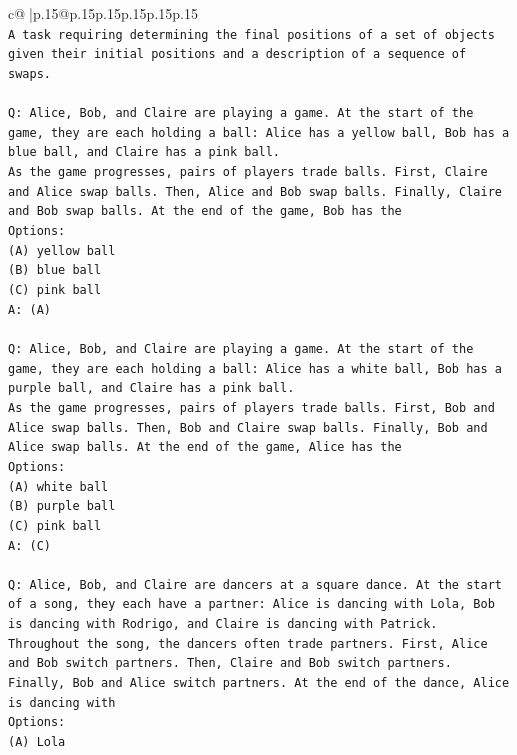 \documentclass{article}
\begin{document}
{\begin{supertabular}{c@{$\;$}|p{.15\linewidth}@{}p{.15\linewidth}p{.15\linewidth}p{.15\linewidth}p{.15\linewidth}p{.15\linewidth}}
{{{\\ 
\texttt{A task requiring determining the final positions of a set of objects given their initial positions and a description of a sequence of swaps.} \\
\\ 
\texttt{Q: Alice, Bob, and Claire are playing a game. At the start of the game, they are each holding a ball: Alice has a yellow ball, Bob has a blue ball, and Claire has a pink ball.} \\
\texttt{As the game progresses, pairs of players trade balls. First, Claire and Alice swap balls. Then, Alice and Bob swap balls. Finally, Claire and Bob swap balls. At the end of the game, Bob has the} \\
\texttt{Options:} \\
\texttt{(A) yellow ball} \\
\texttt{(B) blue ball} \\
\texttt{(C) pink ball} \\
\texttt{A: (A)} \\
\\ 
\texttt{Q: Alice, Bob, and Claire are playing a game. At the start of the game, they are each holding a ball: Alice has a white ball, Bob has a purple ball, and Claire has a pink ball.} \\
\texttt{As the game progresses, pairs of players trade balls. First, Bob and Alice swap balls. Then, Bob and Claire swap balls. Finally, Bob and Alice swap balls. At the end of the game, Alice has the} \\
\texttt{Options:} \\
\texttt{(A) white ball} \\
\texttt{(B) purple ball} \\
\texttt{(C) pink ball} \\
\texttt{A: (C)} \\
\\ 
\texttt{Q: Alice, Bob, and Claire are dancers at a square dance. At the start of a song, they each have a partner: Alice is dancing with Lola, Bob is dancing with Rodrigo, and Claire is dancing with Patrick.} \\
\texttt{Throughout the song, the dancers often trade partners. First, Alice and Bob switch partners. Then, Claire and Bob switch partners. Finally, Bob and Alice switch partners. At the end of the dance, Alice is dancing with} \\
\texttt{Options:} \\
\texttt{(A) Lola} \\
}}}
\end{supertabular}}
\end{document}
